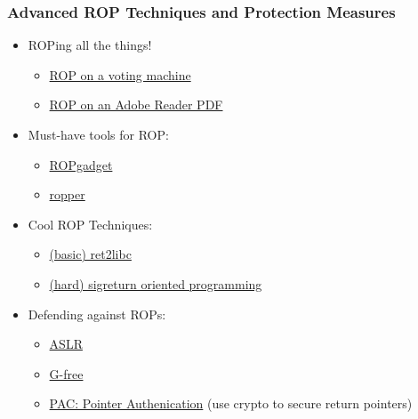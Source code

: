 \documentclass[aspectratio=169]{beamer}
\begin{document}
\begin{frame}
    \frametitle{Advanced ROP Techniques and Protection Measures}
    \begin{itemize}
        \item ROPing all the things!
        \begin{itemize}
            \item \href{https://www.sciencedaily.com/releases/2009/08/090810161902.htm}{ROP on a voting machine}
            \item \href{https://www.fireeye.com/blog/threat-research/2013/02/the-number-of-the-beast.html}{ROP on an Adobe Reader PDF}
        \end{itemize}
        \item Must-have tools for ROP:
        \begin{itemize}
            \item \href{http://shell-storm.org/project/ROPgadget/}{ROPgadget}
            \item \href{https://scoding.de/ropper/}{ropper}
        \end{itemize}
        \item Cool ROP Techniques:
        \begin{itemize}
            \item \href{https://en.wikipedia.org/wiki/Return-to-libc_attack}{(basic) ret2libc}
            \item \href{https://en.wikipedia.org/wiki/Sigreturn-oriented_programming}{(hard) sigreturn oriented programming}
        \end{itemize}
        \item Defending against ROPs:
        \begin{itemize}
            \item \href{https://en.wikipedia.org/wiki/Address_space_layout_randomization}{ASLR}
            \item \href{http://s3.eurecom.fr/docs/acsac10_gfree.pdf}{G-free}
            \item \href{https://www.qualcomm.com/media/documents/files/whitepaper-pointer-authentication-on-armv8-3.pdf}{PAC: Pointer Authenication} (use crypto to secure return pointers)
        \end{itemize}
    \end{itemize}
\end{frame}
\end{document}
